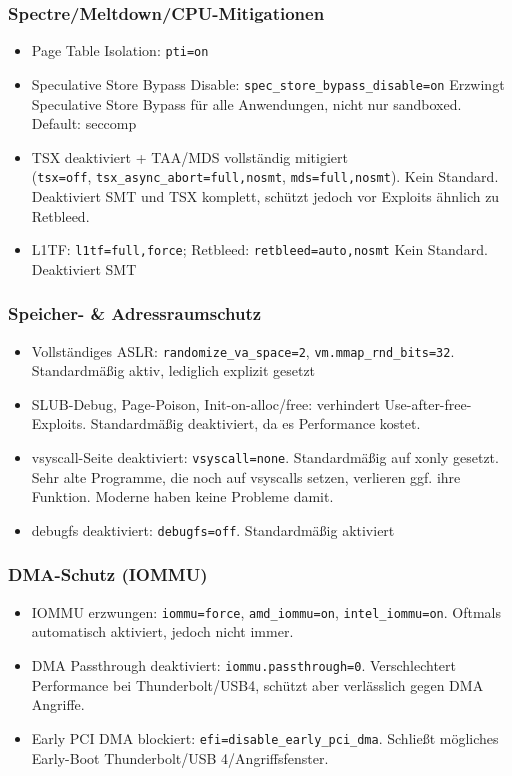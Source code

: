 \subsubsection*{Spectre/Meltdown/CPU-Mitigationen}
\begin{itemize}
  \item Page Table Isolation: \texttt{pti=on}
  \item Speculative Store Bypass Disable: \texttt{spec\_store\_bypass\_disable=on} Erzwingt Speculative Store Bypass für alle Anwendungen, nicht nur sandboxed. Default: seccomp
  \item TSX deaktiviert + TAA/MDS vollständig mitigiert\\
  (\texttt{tsx=off}, \texttt{tsx\_async\_abort=full,nosmt}, \texttt{mds=full,nosmt}). Kein Standard. Deaktiviert \ac{SMT} und \ac{TSX} komplett, schützt jedoch vor Exploits ähnlich zu Retbleed. 
  \item L1TF: \texttt{l1tf=full,force}; Retbleed: \texttt{retbleed=auto,nosmt} Kein Standard. Deaktiviert \ac{SMT} 
\end{itemize}

\subsubsection*{Speicher- \& Adressraumschutz}
\begin{itemize}
  \item Vollständiges ASLR: \texttt{\textcolor{OliveGreen}{randomize\_va\_space=2}}, \texttt{\textcolor{OliveGreen}{vm.mmap\_rnd\_bits=32}}. Standardmäßig aktiv, lediglich explizit gesetzt
  \item SLUB-Debug, Page-Poison, Init-on-alloc/free: verhindert Use-after-free-Exploits. Standardmäßig deaktiviert, da es Performance kostet.
  \item vsyscall-Seite deaktiviert: \texttt{vsyscall=none}. Standardmäßig auf xonly gesetzt. Sehr alte Programme, die noch auf vsyscalls setzen, verlieren ggf. ihre Funktion. Moderne haben keine Probleme damit.
  \item debugfs deaktiviert: \texttt{debugfs=off}. Standardmäßig aktiviert
\end{itemize}

\subsubsection*{DMA-Schutz (IOMMU)}
\begin{itemize}
  \item IOMMU erzwungen: \texttt{iommu=force}, \texttt{amd\_iommu=on}, \texttt{intel\_iommu=on}. Oftmals automatisch aktiviert, jedoch nicht immer.
  \item DMA Passthrough deaktiviert: \texttt{iommu.passthrough=0}. Verschlechtert Performance bei Thunderbolt/USB4, schützt aber verlässlich gegen DMA Angriffe.
  \item Early PCI DMA blockiert: \texttt{efi=disable\_early\_pci\_dma}. Schließt mögliches Early-Boot Thunderbolt/USB 4/Angriffsfenster.
\end{itemize}

